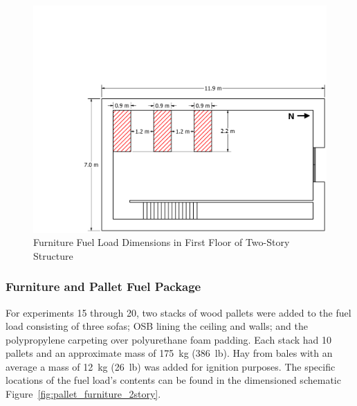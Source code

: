 \documentclass[12pt,oneside]{book}
\begin{document}
\begin{figure}[!ht]
	\includegraphics[width=\columnwidth]{../../DelCo_2014_2015/Drawings/PDFs/CAFS/West_Structure_1st_Floor_Furniture_Only}
	\caption{Furniture Fuel Load Dimensions in First Floor of Two-Story Structure}
	\label{fig:furniture_2story}
\end{figure}

\subsubsection{Furniture and Pallet Fuel Package}
\label{sec:fire_suppression_combo_fuel_2}

For experiments 15 through 20, two stacks of wood pallets were added to the fuel load consisting of three sofas; OSB lining the ceiling and walls; and the polypropylene carpeting over polyurethane foam padding. Each stack had 10 pallets and an approximate mass of 175~kg (386~lb). Hay from bales with an average a mass of 12~kg (26~lb) was added for ignition purposes. The specific locations of the fuel load's contents can be found in the dimensioned schematic Figure~\ref{fig:pallet_furniture_2story}.
\end{document}
